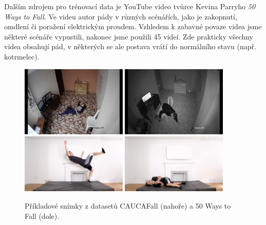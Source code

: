 Dalším zdrojem pro trénovací data je YouTube video tvůrce Kevina Parryho
\textit{50 Ways to Fall}. Ve videu autor pády v různých scénářích, jako je
zakopnutí, omdlení či poražení elektrickým proudem. Vzhledem k zabavné povaze
videa jsme některé scénáře vypustili, nakonec jsme použili 45 videí. Zde
prakticky všechny videa obsahují pád, v některých se ale postava vrátí do
normálního stavu (např. kotrmelec).

\begin{figure}[]
    \centering
    \includegraphics[width=0.45\textwidth]{Figures/datasets_examples/cauca1.png}
    \includegraphics[width=0.45\textwidth]{Figures/datasets_examples/cauca2.png}
    \includegraphics[width=0.45\textwidth]{Figures/datasets_examples/fifty1.png}
    \includegraphics[width=0.45\textwidth]{Figures/datasets_examples/fifty2.png}
    \caption{Příkladové snímky z datasetů CAUCAFall (nahoře) a 50 Ways to Fall (dole).}
    \label{fig:datasets_examples}
\end{figure}

